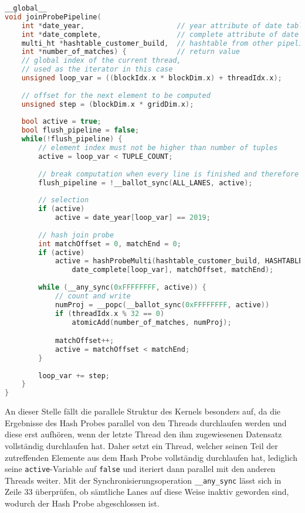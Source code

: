 \newpage

\begin{lstlisting}[language=C++,
caption=Generierter Kernel für den Beispielplan,
label=pipelining_example_code,
linebackgroundcolor={%
\ifnum\value{lstnumber}>22
	\ifnum\value{lstnumber}<26
		\color{red!25}
	\fi
\fi
\ifnum\value{lstnumber}>26
	\ifnum\value{lstnumber}<34
		\color{green!25}
	\fi
\fi
\ifnum\value{lstnumber}>33
	\ifnum\value{lstnumber}<38
		\color{yellow!25}
	\fi
\fi
\ifnum\value{lstnumber}>37
	\ifnum\value{lstnumber}<42
		\color{green!25}
	\fi
\fi
}]
__global__
void joinProbePipeline(
	int *date_year,                      // year attribute of date table
	int *date_complete,                  // complete attribute of date table
	multi_ht *hashtable_customer_build,  // hashtable from other pipeline
	int *number_of_matches) {            // return value
	// global index of the current thread,
	// used as the iterator in this case
	unsigned loop_var = ((blockIdx.x * blockDim.x) + threadIdx.x);
	
	// offset for the next element to be computed
	unsigned step = (blockDim.x * gridDim.x);
	
	bool active = true;
	bool flush_pipeline = false;
	while(!flush_pipeline) {
		// element index must not be higher than number of tuples
		active = loop_var < TUPLE_COUNT;
		
		// break computation when every line is finished and therefore inactive
		flush_pipeline = !__ballot_sync(ALL_LANES, active);
		
		// selection
		if (active)
			active = date_year[loop_var] == 2019;
		
		// hash join probe
		int matchOffset = 0, matchEnd = 0;
		if (active)
			active = hashProbeMulti(hashtable_customer_build, HASHTABLE_SIZE,
				date_complete[loop_var], matchOffset, matchEnd);
		
		while (__any_sync(0xFFFFFFFF, active)) {
			// count and write
			numProj = __popc(__ballot_sync(0xFFFFFFFF, active))
			if (threadIdx.x % 32 == 0)
				atomicAdd(number_of_matches, numProj);

			matchOffset++;
			active = matchOffset < matchEnd;
		}
		
		loop_var += step;
	}
}
\end{lstlisting}

An dieser Stelle fällt die parallele Struktur des Kernels besonders auf, da die Ergebnisse des Hash Probes parallel von den Threads durchlaufen werden und diese erst aufhören, wenn der letzte Thread den ihm zugewiesenen Datensatz vollständig durchlaufen hat.
Daher setzt ein Thread, welcher seinen Teil der zutreffenden Elemente aus dem Hash Probe vollständig durchlaufen hat, lediglich seine \texttt{active}-Variable auf \texttt{false} und iteriert dann parallel mit den anderen Threads weiter.
Mit der Synchronisierungsoperation \texttt{\_\_any\_sync} lässt sich in Zeile 33 überprüfen, ob sämtliche Lanes auf diese Weise inaktiv geworden sind, wodurch der Hash Probe abgeschlossen ist.

